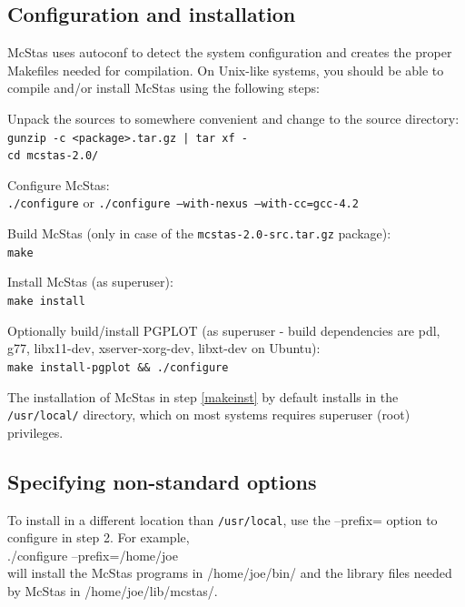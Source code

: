 \subsection{Configuration and installation}
McStas uses autoconf to detect the system configuration and creates the
proper Makefiles needed for compilation. On Unix-like systems, you
should be able to compile and/or install McStas using the following steps:
\begin{enumerate}
\item{Unpack the sources to somewhere convenient and change to the
    source directory:\\
  \texttt{gunzip -c <package>.tar.gz | tar xf -}\\
  \texttt{cd mcstas-2.0/}}
\item{Configure McStas:\\
  \texttt{./configure} or \texttt{./configure --with-nexus --with-cc=gcc-4.2}}
\item{Build McStas (only in case of the \verb+mcstas-2.0-src.tar.gz+ package):\\
  \texttt{make}}
\item{Install McStas (as superuser):\\
  \texttt{make install}
\item{Optionally build/install PGPLOT (as superuser - build
    dependencies are pdl, g77, libx11-dev, xserver-xorg-dev, libxt-dev
    on Ubuntu):\\
    \texttt{make install-pgplot \&\& ./configure}
    \label{pg_install}}

\label{makeinst}}
\end{enumerate}



\noindent The installation of McStas in step \ref{makeinst} by default installs in the
\texttt{/usr/local/} directory, which on most systems requires superuser (root)
privileges.

\subsection{Specifying non-standard options}
To install in a different location than \texttt{/usr/local}, use the --prefix= option to
configure in step 2. For example,\\

  ./configure --prefix=/home/joe\\

\noindent will install the McStas programs in /home/joe/bin/ and the
library files needed by McStas in /home/joe/lib/mcstas/.


